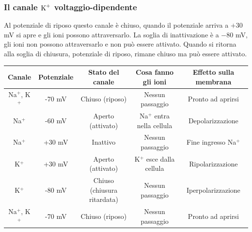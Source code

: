 \subsubsection{Il canale $\ce{K+}$ voltaggio-dipendente}
Al potenziale di riposo questo canale è chiuso, quando il potenziale arriva a $+30$ mV si apre e gli ioni possono attraversarlo. La soglia di inattivazione è a $-80$ mV, gli ioni non possono attraversarlo e non può essere attivato. Quando si ritorna alla soglia di chiusura, potenziale di riposo, rimane chiuso ma può essere attivato.

\begin{table}[h!]
\centering
\renewcommand{\arraystretch}{1.5}
\begin{tabular}{|c|cccc|}
\hline
\textbf{Canale} & \textbf{Potenziale} & \textbf{Stato del canale} & \textbf{Cosa fanno gli ioni} & \textbf{Effetto sulla membrana} \\
\hline
Na$^+$, K$^+$ & -70 mV & Chiuso (riposo) & Nessun passaggio & Pronto ad aprirsi \\
\hline
Na$^+$ & -60 mV & Aperto (attivato) & Na$^+$ entra nella cellula & Depolarizzazione \\
\hline
Na$^+$ & +30 mV & Inattivo & Nessun passaggio & Fine ingresso Na$^+$ \\
\hline
K$^+$ & +30 mV & Aperto (attivato) & K$^+$ esce dalla cellula & Ripolarizzazione \\
\hline
K$^+$ & -80 mV & Chiuso (chiusura ritardata) & Nessun passaggio & Iperpolarizzazione \\
\hline
Na$^+$, K$^+$ & -70 mV & Chiuso (riposo) & Nessun passaggio & Pronto ad aprirsi \\
\hline
\end{tabular}
\end{table}
